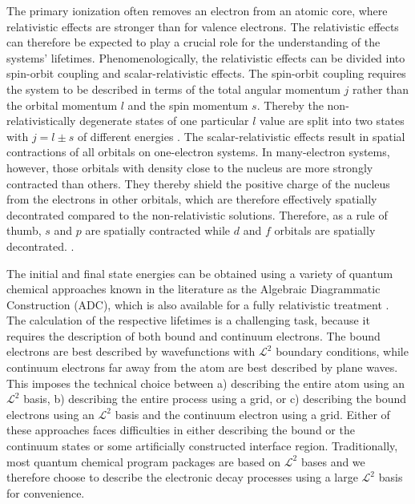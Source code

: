 \documentclass[aps,amssymb,preprint,a4paper]{revtex4}
\begin{document}
The primary ionization often removes an electron from an atomic core, where
relativistic effects are stronger than for valence electrons. The relativistic
effects can therefore be expected to play a crucial role for the understanding
of the systems' lifetimes.
Phenomenologically, the relativistic effects can be divided  
into spin-orbit coupling and scalar-relativistic effects. The spin-orbit       
coupling requires the system to be described in terms of the total angular     
momentum $j$ rather than the orbital momentum $l$ and the spin momentum $s$.   
Thereby the non-relativistically degenerate states of one particular $l$       
value are split into two states with $j=l\pm s$ of different energies          
\cite{ReiherWolf09}.                                            
The scalar-relativistic effects result in spatial contractions of all orbitals on
one-electron systems. In many-electron systems, however, those orbitals with density close
to the nucleus are more strongly contracted than others. They thereby
shield the positive charge of the nucleus from the electrons in other orbitals,
which are therefore effectively spatially decontrated compared to the non-relativistic
solutions. Therefore, as a rule of thumb, $s$ and $p$ are spatially contracted while
$d$ and $f$ orbitals are spatially decontrated. \cite{ReiherWolf09}.

The initial and final state energies can be obtained using      
a variety of quantum chemical approaches known in the literature as the       
Algebraic Diagrammatic Construction \cite{Schirmer82_1,Schirmer91,Schirmer98, 
Mertins96_1} (ADC), which is also                               
available for a fully relativistic treatment                    
\cite{Pernpointner04_1,Pernpointner04_2,Pernpointner10_1}.
The calculation of the respective lifetimes is a challenging task, because it
requires the description of both bound and continuum electrons. The bound electrons
are best described by wavefunctions with $\mathcal{L}^2$ boundary conditions,
while continuum electrons far away from the atom are best described by
plane waves. This imposes the technical choice between a) describing the entire
atom using an $\mathcal{L}^2$ basis, b) describing the entire process using
a grid, or c) describing the bound electrons using an $\mathcal{L}^2$ basis
and the continuum electron using a grid.
Either     
of these approaches faces difficulties in either describing the bound or the  
continuum states or some artificially constructed interface region.
Traditionally, most quantum
chemical program packages are based on $\mathcal{L}^2$ bases and we therefore
choose to describe the electronic decay processes using a large $\mathcal{L}^2$
basis for convenience.
\end{document}
